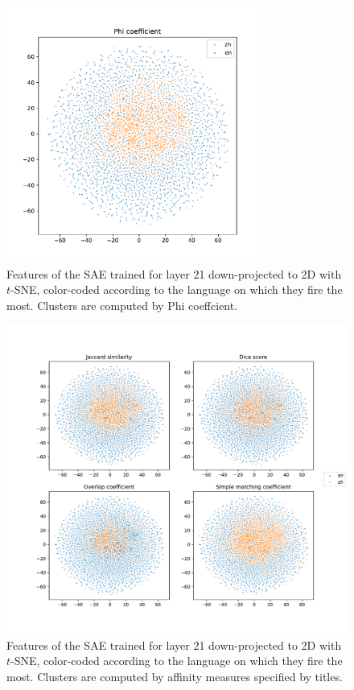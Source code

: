 \documentclass{article}
\begin{document}
\begin{figure}[htbp]
\centerline{\includegraphics[width=0.75\textwidth]{figures/l21-d16384-zh-en-e2001.phi-coef.2d.pdf}}
\caption{Features of the SAE trained for layer 21 down-projected to 2D with \(t\)-SNE, color-coded
  according to the language on which they fire the most. Clusters are computed by Phi coeffcient.}
\label{fig:l21-phi}
\end{figure}

\begin{figure}[htbp]
\centerline{\includegraphics[width=\textwidth]{figures/l21-d16384-zh-en-e2001.four.2d.pdf}}
\caption{Features of the SAE trained for layer 21 down-projected to 2D with \(t\)-SNE, color-coded
  according to the language on which they fire the most. Clusters are computed by affinity measures
  specified by titles.}
\label{fig:l21-four}
\end{figure}
\end{document}
